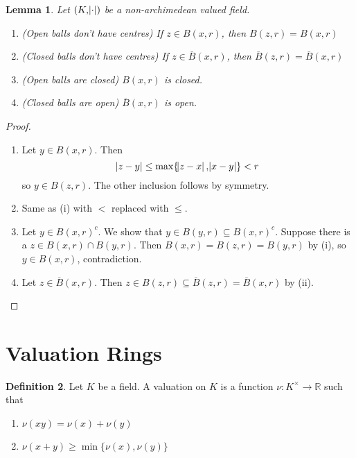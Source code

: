\documentclass[12pt]{amsart}
\theoremstyle{definition}
\newtheorem{definition}{Definition}[section]
\theoremstyle{plain}
\newtheorem{lemma}[definition]{Lemma}
\theoremstyle{remark}
\newcommand{\bR}{\mathbb{R}}
\begin{document}
\begin{lemma}\label{lem:1_8}
    Let $(K, \abs{\cdot})$ be a non-archimedean valued field.
    \begin{enumerate}
        \item (Open balls don't have centres) If $z \in B(x, r)$, then $B(z, r) = B(x, r)$
        \item (Closed balls don't have centres) If $z \in \overline{B}(x, r)$, then $\overline{B}(z, r) = \overline{B}(x, r)$
        \item (Open balls are closed) $B(x, r)$ is closed.
        \item (Closed balls are open) $\overline{B}(x, r)$ is open.
    \end{enumerate}
\end{lemma}
\begin{proof}\phantom{}
    \begin{enumerate}
        \item Let $y \in B(x, r)$. Then
            \begin{equation*}
                \abs{z - y} \le \max\{\abs{z-x}, \abs{x-y}\} < r
            \end{equation*}
            so $y \in B(z, r)$. The other inclusion follows by symmetry.
        \item Same as (i) with $<$ replaced with $\le$.
        \item Let $y \in B(x, r)^c$. We show that $y \in B(y, r) \subseteq B(x, r)^c$. Suppose there is a $z \in B(x, r) \cap B(y, r)$. Then $B(x, r) = B(z, r) = B(y, r)$ by (i), so $y \in B(x, r)$, contradiction.
        \item Let $z \in \overline{B}(x, r)$. Then $z \in B(z, r) \subseteq \overline{B}(z, r) = \overline{B}(x, r)$ by (ii). \qedhere
    \end{enumerate}
\end{proof}

\section{Valuation Rings}

\begin{definition}
    Let $K$ be a field. A valuation on $K$ is a function $\nu : K^\times \to \bR$ such that
    \begin{enumerate}
        \item $\nu(xy) = \nu(x) + \nu(y)$
        \item $\nu(x + y) \ge \min\{\nu(x), \nu(y)\}$
    \end{enumerate}
\end{definition}
\end{document}
